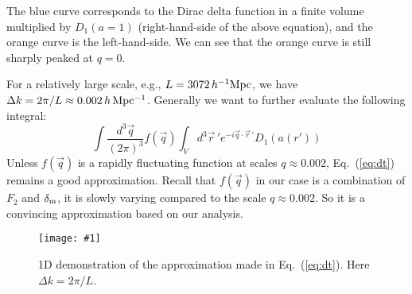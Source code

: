 \documentclass[prd,amsmath,amssymb,floatfix,superscriptaddress,nofootinbib,twocolumn]{revtex4-1}
\def\be{\begin{equation}}
\def\ee{\end{equation}}
\newcommand{\vrr}{\vec{r}}
\newcommand{\ec}[1]{Eq.~(\ref{eq:#1})}
\newcommand{\sfig}[2]{
\texttt{[image: \#1]}
        }
\newcommand{\Sfig}[2]{
   \begin{figure}[thbp]
   \begin{center}
    \sfig{#1.pdf}{\columnwidth}
    \caption{{\small #2}}
    \label{fig:#1}
     \end{center}
   \end{figure}
}
\begin{document}
The blue curve corresponds to the Dirac delta function in a finite volume multiplied by $D_{1}(a=1)$ (right-hand-side of the above equation), and the orange curve is the left-hand-side. We can see that the orange curve is still sharply peaked at $q=0$. 

For a relatively large scale, e.g., $L=3072\, h^{-1}\rm Mpc$, we have $\Delta k=2\pi/L\approx 0.002 \, h \, \rm Mpc^{-1}$. Generally we want to further evaluate the following integral:
\be
\int \frac{d^{3}\vec{q}}{(2\pi)^3}f(\vec{q}) \int_{V} d^{3}\vrr\, 'e^{-i\vec{q}\cdot \vrr\, '}{D_{1}(a(r'))}
\ee 
Unless $f(\vec{q})$ is a rapidly fluctuating function at scales $q \approx 0.002$, \ec{dt} remains a good approximation. Recall that $f(\vec{q})$ in our case is a combination of $F_{2}$ and $\delta_{\rm m}$, it is slowly varying compared to the scale $q \approx 0.002$. So it is a convincing approximation based on our analysis.

\Sfig{approx}{1D demonstration of the approximation made in \ec{dt}. Here $\Delta k=2\pi /L$.}
\end{document}
